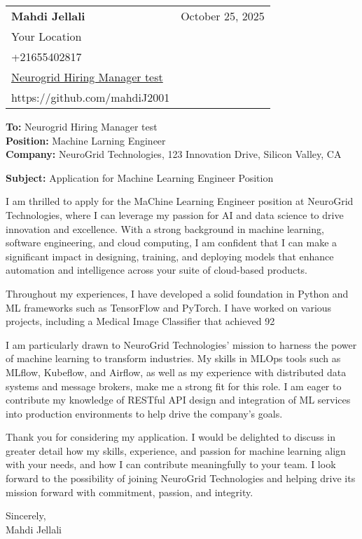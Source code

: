 \documentclass[letterpaper,11pt]{article}
\makeatletter
\newcommand{\letterHeading}[5]{
    \begin{tabular*}{\textwidth}{l@{\extracolsep{\fill}}r}
    \textbf{\Large #1} & #5 \\  %
    #2 & \\
    #3 & \\
    #4 & \\
    \end{tabular*}
    \vspace{15pt}
}
\newcommand{\letterRecipient}[3]{
    \textbf{\large To:} #1 \\
    \textbf{\large Position:} #2 \\
    \textbf{\large Company:} #3 \\
    \vspace{12pt}
}
\newcommand{\letterSubject}[1]{
    \textbf{\large Subject:} #1 \\
    \vspace{15pt}
}
\makeatother
\begin{document}
    \letterHeading
    {Mahdi Jellali}
    {Your Location}
    {+21655402817 \\ \href{mailto:Neurogrid Hiring Manager test}{Neurogrid Hiring Manager test}}
    {https://github.com/mahdiJ2001}
    {October 25, 2025}

    \letterRecipient
    {Neurogrid Hiring Manager test}
    {Machine Larning Engineer}
    {NeuroGrid Technologies, 123 Innovation Drive, Silicon Valley, CA}

    \letterSubject{Application for Machine Learning Engineer Position}

I am thrilled to apply for the MaChine Learning Engineer position at NeuroGrid Technologies, where I can leverage my passion for AI and data science to drive innovation and excellence. With a strong background in machine learning, software engineering, and cloud computing, I am confident that I can make a significant impact in designing, training, and deploying models that enhance automation and intelligence across your suite of cloud-based products.

    Throughout my experiences, I have developed a solid foundation in Python and ML frameworks such as TensorFlow and PyTorch. I have worked on various projects, including a Medical Image Classifier that achieved 92%

    I am particularly drawn to NeuroGrid Technologies' mission to harness the power of machine learning to transform industries. My skills in MLOps tools such as MLflow, Kubeflow, and Airflow, as well as my experience with distributed data systems and message brokers, make me a strong fit for this role. I am eager to contribute my knowledge of RESTful API design and integration of ML services into production environments to help drive the company's goals.

    Thank you for considering my application. I would be delighted to discuss in greater detail how my skills, experience, and passion for machine learning align with your needs, and how I can contribute meaningfully to your team. I look forward to the possibility of joining NeuroGrid Technologies and helping drive its mission forward with commitment, passion, and integrity.

    Sincerely,\\[12pt]

    Mahdi Jellali
\end{document}
